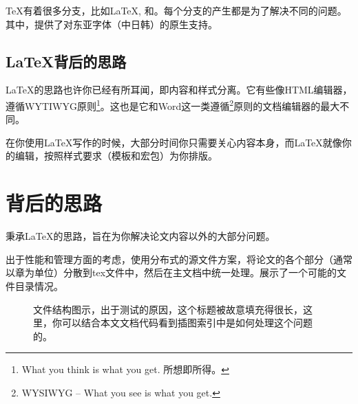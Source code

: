 \TeX{}有着很多分支，比如\LaTeX{}, \LuaTeX{}和\XeTeX{}。每个分支的产生都是为了解决不同的问题。其中，\XeTeX{}提供了对东亚字体（中日韩）的原生支持。


\subsection{\LaTeX{}背后的思路}

\LaTeX{}的思路也许你已经有所耳闻，即{\heiti{}内容和样式分离。}它有些像HTML编辑器，遵循\textsf{WYTIWYG}原则\footnote{What you think is what you get. 所想即所得。}。这也是它和Word这一类遵循\footnote{\textsf{WYSIWYG} -- What you see is what you get.}原则的文档编辑器的最大不同。

在你使用\LaTeX{}写作的时候，大部分时间你只需要关心内容本身，而\LaTeX{}就像你的编辑，按照样式要求（模板和宏包）为你排版。


\section{\cquthesis{}背后的思路}

\cquthesis{}秉承\LaTeX{}的思路，旨在为你解决论文内容以外的大部分问题。

出于性能和管理方面的考虑，\cquthesis{}使用分布式的源文件方案，将论文的各个部分（通常以章为单位）分散到tex文件中，然后在主文档中统一处理。展示了一个可能的文件目录情况。
\begin{figure}[htb]
\caption[\cquthesis{}文件结构图示]{\cquthesis{}文件结构图示，出于测试的原因，这个标题被故意填充得很长，这里，你可以结合本文文档代码看到插图索引中是如何处理这个问题的。}
\label{fig:filetree}
\end{figure}






